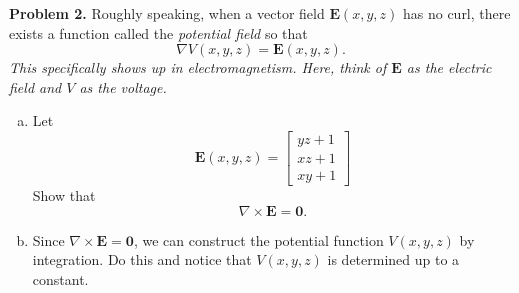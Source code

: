 \documentclass[12pt]{report} %
\theoremstyle{definition}
\begin{document}
\noindent\textbf{Problem 2.} Roughly speaking, when a vector field $\mathbf{E}(x,y,z)$ has no curl, there exists a function called the \emph{potential field} so that
\[
\nabla V(x,y,z) = \mathbf{E}(x,y,z).
\]
\emph{This specifically shows up in electromagnetism.  Here, think of $\mathbf{E}$ as the electric field and $V$ as the voltage.}
\begin{enumerate}[(a)]
    \item Let
    \[
    \mathbf{E}(x,y,z) = \begin{bmatrix} yz +1\\ xz +1\\ xy+1 \end{bmatrix}
    \]
    Show that 
    \[
    \nabla \times \mathbf{E} = \mathbf{0}.
    \]
    \item Since $\nabla \times \mathbf{E}=\mathbf{0}$, we can construct the potential function $V(x,y,z)$ by integration.  Do this and notice that $V(x,y,z)$ is determined up to a constant.
\end{enumerate}
\end{document}
